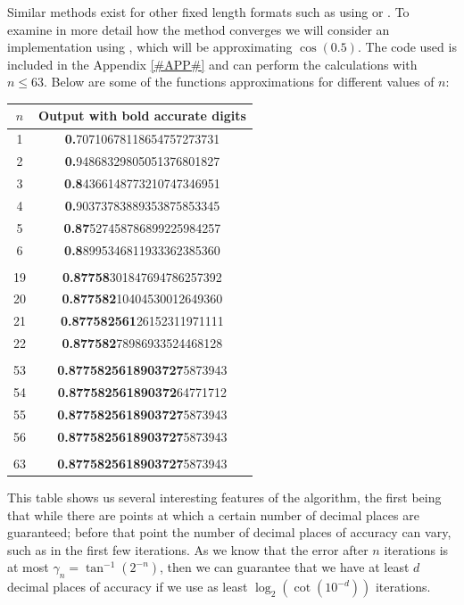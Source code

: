 {Similar methods exist for other fixed length formats such as using  or . To examine in more detail how the method converges we will consider an implementation using , which will be approximating \(\cos(0.5)\). The code used is included in the Appendix \ref{#APP#} and can perform the calculations with \(n \le 63\). Below are some of the functions approximations for different values of \(n\):

{\selectfont
\begin{center}
\begin{tabular}{|c|c|}
	\hline
	\(n\) & \textsf{Output with bold accurate digits}\\\hline
	1 & \textbf{0.}70710678118654757273731\\\hline
	2 & \textbf{0.}94868329805051376801827\\\hline
	3 & \textbf{0.8}4366148773210747346951\\\hline
	4 & \textbf{0.}90373783889353875853345\\\hline
	5 & \textbf{0.87}527458786899225984257\\\hline
	6 & \textbf{0.8}8995346811933362385360\\\hline
	\cdots & \cdots\\\hline
	19 & \textbf{0.87758}301847694786257392\\\hline
	20 & \textbf{0.877582}10404530012649360\\\hline
	21 & \textbf{0.877582561}26152311971111\\\hline
	22 & \textbf{0.877582}78986933524468128\\\hline
	\cdots & \cdots\\\hline
	53 & \textbf{0.8775825618903727}5873943\\\hline
	54 & \textbf{0.877582561890372}64771712\\\hline
	55 & \textbf{0.8775825618903727}5873943\\\hline
	56 & \textbf{0.8775825618903727}5873943\\\hline
	\cdots & \cdots\\\hline
	63 & \textbf{0.8775825618903727}5873943\\\hline
\end{tabular}
\end{center}}

This table shows us several interesting features of the algorithm, the first being that while there are points at which a certain number of decimal places are guaranteed; before that point the number of decimal places of accuracy can vary, such as in the first few iterations. As we know that the error after \(n\) iterations is at most \(\gamma_n = \tan^{-1}(2^{-n})\), then we can guarantee that we have at least \(d\) decimal places of accuracy if we use as least \(\log_2(\cot(10^{-d}))\) iterations.\\

}
